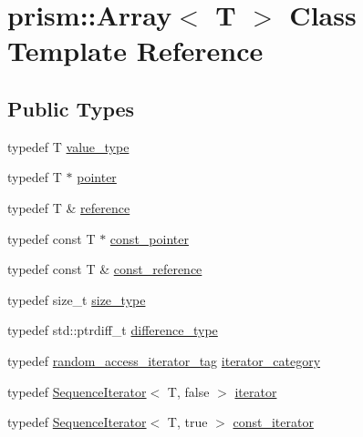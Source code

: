 \hypertarget{classprism_1_1_array}{}\section{prism\+:\+:Array$<$ T $>$ Class Template Reference}
\label{classprism_1_1_array}
\subsection*{Public Types}
\begin{DoxyCompactItemize}
\item 
typedef T \hyperlink{classprism_1_1_array_a7b6dc8358fdfe216f4477a361190c9af}{value\+\_\+type}
\item 
typedef T $\ast$ \hyperlink{classprism_1_1_array_a391b8bb39ab945786ca33a0110fc163c}{pointer}
\item 
typedef T \& \hyperlink{classprism_1_1_array_a1ebfd26a4f219fcb24eb7f068704d9aa}{reference}
\item 
typedef const T $\ast$ \hyperlink{classprism_1_1_array_a555c4123ec8e113e5ff25e0e5a3525d0}{const\+\_\+pointer}
\item 
typedef const T \& \hyperlink{classprism_1_1_array_a7736e6455cfc2e330981405251756394}{const\+\_\+reference}
\item 
typedef size\+\_\+t \hyperlink{classprism_1_1_array_a8ceacda8c2a68bf5b54e07a8c4f5f8e3}{size\+\_\+type}
\item 
typedef std\+::ptrdiff\+\_\+t \hyperlink{classprism_1_1_array_abae2669a2cdeba360b37d2f872af9208}{difference\+\_\+type}
\item 
typedef \hyperlink{structprism_1_1random__access__iterator__tag}{random\+\_\+access\+\_\+iterator\+\_\+tag} \hyperlink{classprism_1_1_array_a68b5c70152e822463f8d2a3c0c5bebcb}{iterator\+\_\+category}
\item 
typedef \hyperlink{structprism_1_1_sequence_iterator}{Sequence\+Iterator}$<$ T, false $>$ \hyperlink{classprism_1_1_array_acf99b1f921727cf61cf9d5b66acc66b8}{iterator}
\item 
typedef \hyperlink{structprism_1_1_sequence_iterator}{Sequence\+Iterator}$<$ T, true $>$ \hyperlink{classprism_1_1_array_a1654729fe986281be9c0064999caf3d7}{const\+\_\+iterator}
\end{DoxyCompactItemize}
